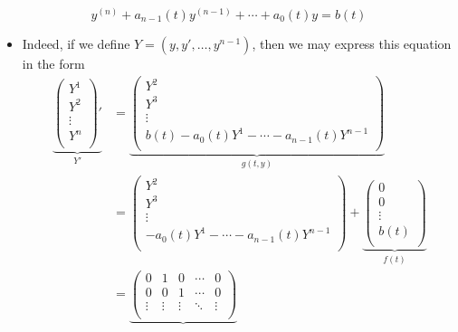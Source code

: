\documentclass[../notes.tex]{subfiles}
\begin{document}
\begin{itemize}
\begin{equation*}
        y^{(n)}+a_{n-1}(t)y^{(n-1)}+\cdots+a_0(t)y = b(t)
    \end{equation*}
    \begin{itemize}
        \item Indeed, if we define $Y=(y,y',\dots,y^{n-1})$, then we may express this equation in the form
        \begin{align*}
            \underbrace{
                \begin{pmatrix}
                    Y^1\\
                    Y^2\\
                    \vdots\\
                    Y^n\\
                \end{pmatrix}'
            }_{Y'}
            &= \underbrace{
                \begin{pmatrix}
                    Y^2\\
                    Y^3\\
                    \vdots\\
                    b(t)-a_0(t)Y^1-\cdots-a_{n-1}(t)Y^{n-1}\\
                \end{pmatrix}
            }_{g(t,y)}\\
            &=
            \begin{pmatrix}
                Y^2\\
                Y^3\\
                \vdots\\
                -a_0(t)Y^1-\cdots-a_{n-1}(t)Y^{n-1}\\
            \end{pmatrix}
            +\underbrace{
                \begin{pmatrix}
                    0\\
                    0\\
                    \vdots\\
                    b(t)\\
                \end{pmatrix}
            }_{f(t)}\\
            &= \underbrace{
                \begin{pmatrix}
                    0 & 1 & 0 & \cdots & 0\\
                    0 & 0 & 1 & \cdots & 0\\
                    \vdots & \vdots & \vdots & \ddots & \vdots\\

\end{pmatrix}}
\end{align*}
\end{itemize}
\end{itemize}
\end{document}
